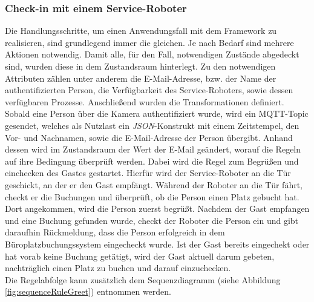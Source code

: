     \subsubsection*{Check-in mit einem Service-Roboter}
        Die Handlungsschritte, um einen Anwendungsfall mit dem Framework zu realisieren, sind grundlegend immer die gleichen. Je nach Bedarf sind mehrere 
        Aktionen notwendig. Damit alle, für den Fall, notwendigen Zustände abgedeckt sind, wurden diese in dem Zustandsraum hinterlegt. Zu den notwendigen Attributen 
        zählen unter anderem die E-Mail-Adresse, bzw. der Name der authentifizierten Person, die Verfügbarkeit des Service-Roboters, sowie dessen 
        verfügbaren Prozesse. Anschließend wurden die Transformationen definiert. 
        \\
        \linebreak
        Sobald eine Person über die Kamera authentifiziert wurde, wird ein \acs{MQTT}-Topic gesendet, welches als Nutzlast ein \textit{JSON}-Konstrukt mit einem Zeitstempel, den 
        Vor- und Nachnamen, sowie die E-Mail-Adresse der Person übergibt. Anhand dessen wird im Zustandsraum der Wert der E-Mail geändert, worauf die Regeln auf ihre 
        Bedingung überprüft werden. Dabei wird die Regel zum Begrüßen und einchecken des Gastes gestartet. Hierfür wird der Service-Roboter an die Tür geschickt, an der er den 
        Gast empfängt. Während der Roboter an die Tür fährt, checkt er die Buchungen und überprüft, ob die Person einen Platz gebucht hat. Dort angekommen, wird die Person zuerst 
        begrüßt. Nachdem der Gast empfangen und eine Buchung gefunden wurde, checkt der Roboter die Person ein und gibt daraufhin Rückmeldung, dass die Person erfolgreich in dem 
        Büroplatzbuchungssystem eingecheckt wurde. Ist der Gast bereits eingechekt oder hat vorab keine Buchung getätigt, wird der Gast aktuell darum gebeten, nachträglich 
        einen Platz zu buchen und darauf einzuchecken. 
        \\
        Die Regelabfolge kann zusätzlich dem Sequenzdiagramm (siehe Abbildung \ref{fig:sequenceRuleGreet}) entnommen werden.
